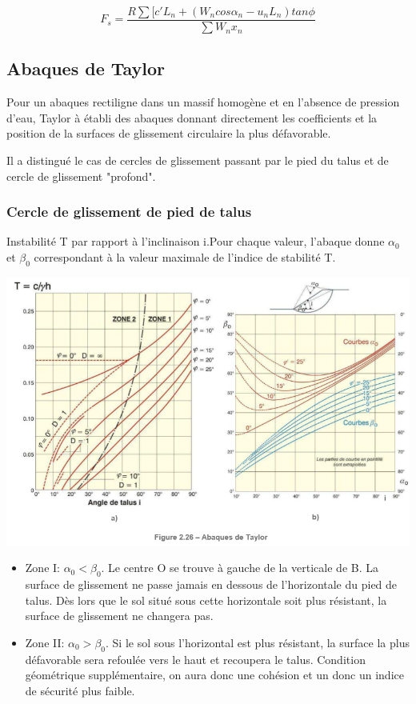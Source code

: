 $$ F_s = \frac{R \sum[c'L_n+(W_n cos \alpha_n - u_n L_n) tan \phi}{\sum W_n x_n} $$

\subsection{Abaques de Taylor}

Pour un abaques rectiligne dans un massif homogène et en l'absence de pression d'eau, Taylor à établi des abaques donnant directement les coefficients et la position de la surfaces de glissement circulaire la plus défavorable. 

Il a distingué le cas de cercles de glissement passant par le pied du talus et de cercle de glissement "profond".

\subsubsection{Cercle de glissement de pied de talus}

Instabilité T par rapport à l'inclinaison i.Pour chaque valeur, l'abaque donne $\alpha_0$ et $\beta_0$ correspondant à la valeur maximale de l'indice de stabilité T.

\begin{center}
\includegraphics [scale=0.8]{pictures/at.PNG}
\end{center}

\begin{itemize}
    \item Zone I: $\alpha_0 < \beta_0$. Le centre O se trouve à gauche de la verticale de B. La surface de glissement ne passe jamais en dessous de l'horizontale du pied de talus. Dès lors que le sol situé sous cette horizontale soit plus résistant, la surface de glissement ne changera pas.
    \item Zone II: $\alpha_0 > \beta_0$. Si le sol sous l'horizontal est plus résistant, la surface la plus défavorable sera refoulée vers le haut et recoupera le talus. Condition géométrique supplémentaire, on aura donc une cohésion et un donc un indice de sécurité plus faible.
\end{itemize}

